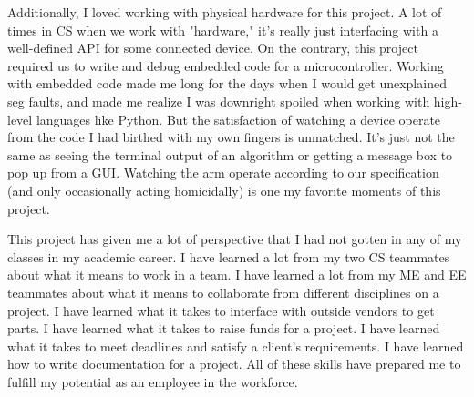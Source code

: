 Additionally, I loved working with physical hardware for this project. A lot of times in CS when we work with "hardware," it's really just interfacing with a well-defined API for some connected device. On the contrary, this project required us to write and debug embedded code for a microcontroller. Working with embedded code made me long for the days when I would get unexplained seg faults, and made me realize I was downright spoiled when working with high-level languages like Python. But the satisfaction of watching a device operate from the code I had birthed with my own fingers is unmatched. It's just not the same as seeing the terminal output of an algorithm or getting a message box to pop up from a GUI. Watching the arm operate according to our specification (and only occasionally acting homicidally) is one my favorite moments of this project.

This project has given me a lot of perspective that I had not gotten in any of my classes in my academic career. I have learned a lot from my two CS teammates about what it means to work in a team. I have learned a lot from my ME and EE teammates about what it means to collaborate from different disciplines on a project. I have learned what it takes to interface with outside vendors to get parts. I have learned what it takes to raise funds for a project. I have learned what it takes to meet deadlines and satisfy a client's requirements. I have learned how to write documentation for a project. All of these skills have prepared me to fulfill my potential as an employee in the workforce.

